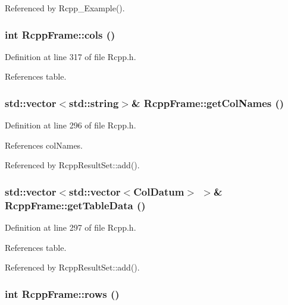 Referenced by Rcpp\_\-Example().\hypertarget{classRcppFrame_aac33f787068fe1bc6f97b2b4e08c9c5d}{
\subsubsection[{cols}]{\setlength{\rightskip}{0pt plus 5cm}int RcppFrame::cols ()}}
\label{classRcppFrame_aac33f787068fe1bc6f97b2b4e08c9c5d}


Definition at line 317 of file Rcpp.h.

References table.\hypertarget{classRcppFrame_ad220bfd289e745d13a99ffe323a00200}{
\subsubsection[{getColNames}]{\setlength{\rightskip}{0pt plus 5cm}std::vector$<$std::string$>$\& RcppFrame::getColNames ()}}
\label{classRcppFrame_ad220bfd289e745d13a99ffe323a00200}


Definition at line 296 of file Rcpp.h.

References colNames.

Referenced by RcppResultSet::add().\hypertarget{classRcppFrame_a3a0ac7b2822fc590f6f93ee775b134d0}{
\subsubsection[{getTableData}]{\setlength{\rightskip}{0pt plus 5cm}std::vector$<$std::vector$<${\bf ColDatum}$>$ $>$\& RcppFrame::getTableData ()}}
\label{classRcppFrame_a3a0ac7b2822fc590f6f93ee775b134d0}


Definition at line 297 of file Rcpp.h.

References table.

Referenced by RcppResultSet::add().\hypertarget{classRcppFrame_aa33ab9553bb9fa510c338a3e092d9ace}{
\subsubsection[{rows}]{\setlength{\rightskip}{0pt plus 5cm}int RcppFrame::rows ()}}
\label{classRcppFrame_aa33ab9553bb9fa510c338a3e092d9ace}


